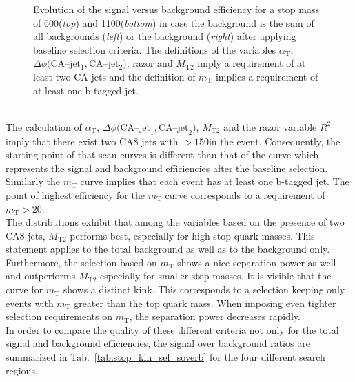 \begin{figure}[!t]
{\begin{tabular}{cc}
  \end{tabular}}
  \caption{Evolution of the signal versus background efficiency for a stop mass of 600\gev (\textit{top}) and 1100\gev (\textit{bottom}) in case the background is the sum of all backgrounds (\textit{left}) or the \ttbar background (\textit{right}) after applying baseline selection criteria. The definitions of the variables $\alpha_\mathrm{T}$, $\Delta \phi(\mathrm{CA}$--$\mathrm{jet_1, CA}$--$\mathrm{jet_2})$, razor and $M_\mathrm{T2}$ imply a requirement of at least two CA-jets and the definition of $m_\mathrm{T}$ implies a requirement of at least one b-tagged jet.}
  \label{fig:stop_baseline_cutscan_kin_vars}
\end{figure}
\\
The calculation of $\alpha_\mathrm{T}$, $\Delta \phi(\mathrm{CA}$--$\mathrm{jet}_1, \mathrm{CA}$--$\mathrm{jet}_2)$, $M_\mathrm{T2}$ and the razor variable $R^2$ imply that there exist two CA8 jets with \pt$> 150$\gev in the event. Consequently, the starting point of that scan curves is different than that of the \met curve which represents the signal and background efficiencies after the baseline selection. Similarly the $m_\mathrm{T}$ curve implies that each event has at least one b-tagged jet. The point of highest efficiency for the $m_\mathrm{T}$ curve corresponds to a requirement of $m_\mathrm{T} > 20$\gev.  \\
The distributions exhibit that among the variables based on the presence of two CA8 jets, $M_\mathrm{T2}$ performs best, especially for high stop quark masses. This statement applies to the total background as well as to the \ttbar background only. Furthermore, the selection based on $m_\mathrm{T}$ shows a nice separation power as well and outperforms $M_\mathrm{T2}$ especially for smaller stop masses. It is visible that the curve for $m_\mathrm{T}$ shows a distinct kink. This corresponds to a selection keeping only events with $m_\mathrm{T}$ greater than the top quark mass. When imposing even tighter selection requirements on $m_\mathrm{T}$, the separation power decreases rapidly. \\
In order to compare the quality of these different criteria not only for the total signal and background efficiencies, the signal over background ratios are summarized in Tab.~\ref{tab:stop_kin_sel_soverb} for the four different search regions. 
